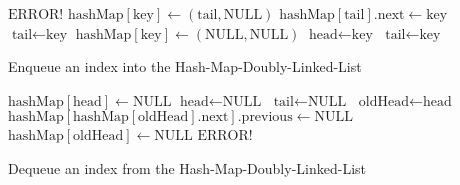 \begin{@empty}
    \begin{algorithm}[h]
        \scriptsize
        \begin{algorithmic}[1]
                        \State \Return $\text{ERROR!}$
                    \EndIf
                    \State $\text{hashMap}\left[\text{key}\right] \gets \left(\text{tail}, \text{NULL}\right)$
                    \State $\text{hashMap}\left[\text{tail}\right].\text{next} \gets \text{key}$
                    \State $\text{tail} \gets \text{key}$
                \Else
                    \State $\text{hashMap}\left[\text{key}\right] \gets \left(\text{NULL}, \text{NULL}\right)$
                    \State $\text{head} \gets \text{key}$
                    \State $\text{tail} \gets \text{key}$
                \EndIf
            \EndFunction
        \end{algorithmic}
        \vspace{1em}
        \caption[{\footnotesize \textbf{function} \textsc{enqueue}} of Hash-Map-Doubly-Linked-List]{Enqueue an index into the Hash-Map-Doubly-Linked-List}
        \label{alg:hashmapdoublylinkedlistenqueue}
    \end{algorithm}
\end{@empty}

\begin{@empty}
    \begin{algorithm}[h]
        \scriptsize
        \begin{algorithmic}[1]
                    \State $\text{hashMap}\left[\text{head}\right] \gets \text{NULL}$
                    \State $\text{head} \gets \text{NULL}$
                    \State $\text{tail} \gets \text{NULL}$
                    \State $\text{oldHead} \gets \text{head}$
                    \State $\text{hashMap}\left[\text{hashMap}\left[\text{oldHead}\right].\text{next}\right].\text{previous} \gets \text{NULL}$
                    \State $\text{hashMap}\left[\text{oldHead}\right] \gets \text{NULL}$
                \Else
                    \State \Return $\text{ERROR!}$
                \EndIf
            \EndFunction
        \end{algorithmic}
        \vspace{1em}
        \caption[{\footnotesize \textbf{function} \textsc{dequeue}} of Hash-Map-Doubly-Linked-List]{Dequeue an index from the Hash-Map-Doubly-Linked-List}
        \label{alg:hashmapdoublylinkedlistdequeue}
    \end{algorithm}
\end{@empty}


